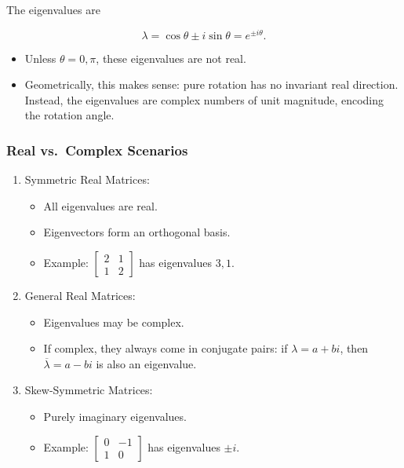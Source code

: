 \documentclass[
  letterpaper,
  DIV=11,
  numbers=noendperiod]{scrreprt}
\providecommand{\tightlist}{%
  \setlength{\itemsep}{0pt}\setlength{\parskip}{0pt}}
\begin{document}
The eigenvalues are

\[
\lambda = \cos\theta \pm i \sin\theta = e^{\pm i\theta}.
\]

\begin{itemize}
\tightlist
\item
  Unless \(\theta = 0, \pi\), these eigenvalues are not real.
\item
  Geometrically, this makes sense: pure rotation has no invariant real
  direction. Instead, the eigenvalues are complex numbers of unit
  magnitude, encoding the rotation angle.
\end{itemize}

\subsubsection{Real vs.~Complex
Scenarios}\label{real-vs.-complex-scenarios}

\begin{enumerate}
\def\labelenumi{\arabic{enumi}.}
\item
  Symmetric Real Matrices:

  \begin{itemize}
  \tightlist
  \item
    All eigenvalues are real.
  \item
    Eigenvectors form an orthogonal basis.
  \item
    Example: \(\begin{bmatrix} 2 & 1 \\ 1 & 2 \end{bmatrix}\) has
    eigenvalues \(3, 1\).
  \end{itemize}
\item
  General Real Matrices:

  \begin{itemize}
  \tightlist
  \item
    Eigenvalues may be complex.
  \item
    If complex, they always come in conjugate pairs: if
    \(\lambda = a+bi\), then \(\overline{\lambda} = a-bi\) is also an
    eigenvalue.
  \end{itemize}
\item
  Skew-Symmetric Matrices:

  \begin{itemize}
  \tightlist
  \item
    Purely imaginary eigenvalues.
  \item
    Example: \(\begin{bmatrix} 0 & -1 \\ 1 & 0 \end{bmatrix}\) has
    eigenvalues \(\pm i\).
  \end{itemize}
\end{enumerate}
\end{document}
